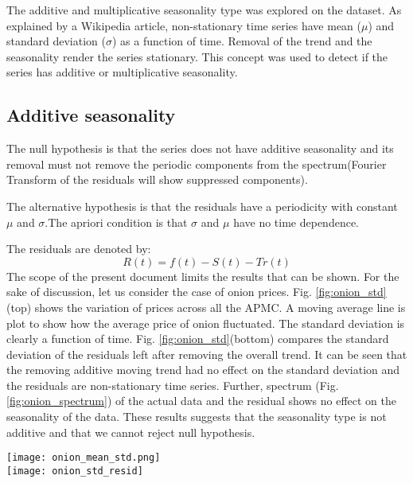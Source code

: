\documentclass{article}
\begin{document}
The additive and multiplicative seasonality type was explored on the dataset. As explained by a Wikipedia article, non-stationary time series have mean ($\mu$) and standard deviation ($\sigma$) as a function of time. Removal of the trend and the seasonality render the series stationary. This concept was used to detect if the series has additive or multiplicative seasonality. 
\subsection{Additive seasonality}
The null hypothesis is that the series does not have additive seasonality and its removal must not remove the periodic components from the spectrum(Fourier Transform of the residuals will show suppressed components). \par
The alternative hypothesis is that the residuals have a periodicity with constant $\mu$ and $\sigma$.The apriori condition is that $\sigma $ and $\mu$ have no time dependence.\par
The residuals are denoted by:
\begin{equation}
	R(t) = f(t) - S(t) -Tr(t)
\end{equation}
The scope of the present document limits the results that can be shown. For the sake of discussion, let us consider the case of onion prices. Fig. \ref{fig:onion_std}(top) shows the variation of prices across all the APMC. A moving average line is plot to show how the average price of onion fluctuated. The standard deviation is clearly a function of time. Fig. \ref{fig:onion_std}(bottom) compares the standard deviation of the residuals left after removing the overall trend. It can be seen that the removing additive moving trend had no effect on the standard deviation and the residuals are non-stationary time series. Further, spectrum (Fig. \ref{fig:onion_spectrum}) of the actual data and the residual shows no effect on the seasonality of the data. These results suggests that the seasonality type is not additive and that we cannot reject null hypothesis.
\begin{figure*}
	\texttt{[image: onion\_mean\_std.png]}\\
	\texttt{[image: onion\_std\_resid]}
	\caption{Top figure shows the data with its moving average and standard deviation. The bottom figure shows the mean and standard deviation after removing the overall trend under the assumption of additive seasonality and comparison of standard deviation before and after removing the overall trend.}
	\label{fig:onion_std}
\end{figure*}
\end{document}

